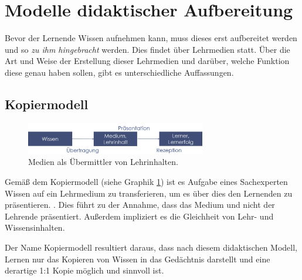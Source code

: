 \section{Modelle didaktischer Aufbereitung}
\label{sec:Lernmodelle}
Bevor der Lernende Wissen aufnehmen kann, muss dieses erst aufbereitet werden und so \emph{zu ihm hingebracht} werden. Dies findet über Lehrmedien statt. Über die Art und Weise der Erstellung dieser Lehrmedien und darüber, welche Funktion diese genau haben sollen, gibt es unterschiedliche Auffassungen. \cite[S. 145 ff.]{Kerres.2001}

\subsection{Kopiermodell}
\label{sub:Kopiermodell}
\begin{figure}[h]
	\centering
	\includegraphics[width=0.7\textwidth]{Abbildungen/Kopiermodell.PNG}
	\caption{Medien als Übermittler von Lehrinhalten. \cite[S. 146]{Kerres.2001}}
	\label{fig:Kerres2001_Kopiermodell}
\end{figure}
Gemäß dem Kopiermodell (siehe Graphik \ref{fig:Kerres2001_Kopiermodell}) ist es Aufgabe eines Sachexperten Wissen auf ein Lehrmedium zu transferieren, um es über dies den Lernenden zu präsentieren. \cite[S. 146]{Kerres.2001}. Dies führt zu der Annahme, dass das Medium und nicht der Lehrende präsentiert. Außerdem impliziert es die Gleichheit von Lehr- und Wissensinhalten. %

Der Name Kopiermodell resultiert daraus, dass nach diesem didaktischen Modell, Lernen nur das Kopieren von Wissen in das Gedächtnis darstellt und eine derartige 1:1 Kopie möglich und sinnvoll ist. \cite[S. 145 f.]{Kerres.2001}

